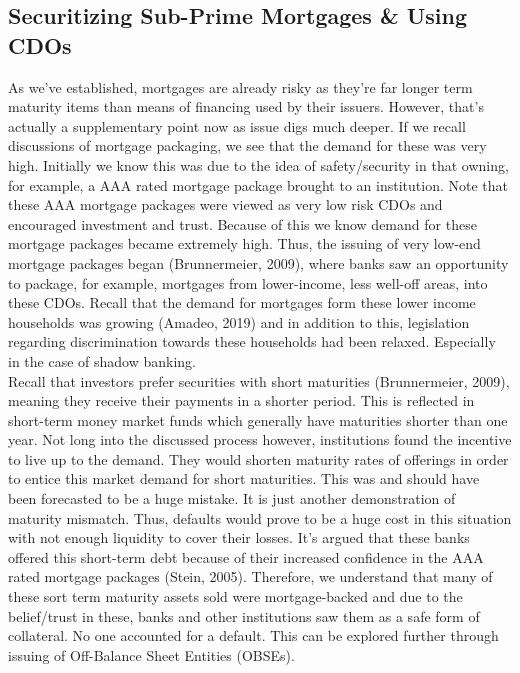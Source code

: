 \documentclass[11pt, english]{article}
\begin{document}
	\subsection{Securitizing Sub-Prime Mortgages \& Using CDOs}

	As we’ve established, mortgages are already risky as they’re far longer term maturity items than means of financing used by their issuers. However, that’s actually a supplementary point now as issue digs much deeper. If we recall discussions of mortgage packaging, we see that the demand for these was very high. Initially we know this was due to the idea of safety/security in that owning, for example, a AAA rated mortgage package brought to an institution. Note that these AAA mortgage packages were viewed as very low risk CDOs and encouraged investment and trust. Because of this we know demand for these mortgage packages became extremely high. Thus, the issuing of very low-end mortgage packages began (Brunnermeier, 2009), where banks saw an opportunity to package, for example, mortgages from lower-income, less well-off areas, into these CDOs. Recall that the demand for mortgages form these lower income households was growing (Amadeo, 2019) and in addition to this, legislation regarding discrimination towards these households had been relaxed. Especially in the case of shadow banking.\\

	Recall that investors prefer securities with short maturities (Brunnermeier, 2009), meaning they receive their payments in a shorter period. This is reflected in short-term money market funds which generally have maturities shorter than one year. Not long into the discussed process however, institutions found the incentive to live up to the demand. They would shorten maturity rates of offerings in order to entice this market demand for short maturities. This was and should have been forecasted to be a huge mistake. It is just another demonstration of maturity mismatch. Thus, defaults would prove to be a huge cost in this situation with not enough liquidity to cover their losses. It’s argued that these banks offered this short-term debt because of their increased confidence in the AAA rated mortgage packages (Stein, 2005). Therefore, we understand that many of these sort term maturity assets sold were mortgage-backed and due to the belief/trust in these, banks and other institutions saw them as a safe form of collateral. No one accounted for a default. This can be explored further through issuing of Off-Balance Sheet Entities (OBSEs).
\end{document}
